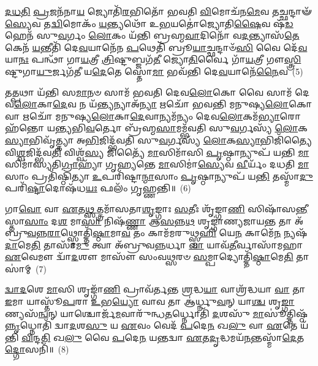 \-\ul{𑌦}\-\-\ul{𑌧}\-\-\ul{𑌤𑌿} \ul{𑌪𑍍𑌰}\-𑌜𑌨᳴𑌨𑌾\-\ul{𑌯} 𑌜𑍍𑌯𑍋𑌤𑌿᳴\-\ul{𑌰}\-𑌭𑌿𑌤𑍋᳴ 𑌭𑌵𑌤𑌿 \ul{𑌵𑌿}\-𑌮𑍋𑌚᳴𑌨\-\ul{𑌮𑍇}\-𑌵 𑌤𑌚𑍍𑌛𑌨𑍍𑌦𑌾𑍟᳴\-\ul{𑌸𑍍𑌯𑍇}\-𑌵 𑌤\-\ul{𑌦𑍍𑌵𑌿}\-𑌮𑍋𑌕𑌂᳴ \ul{𑌯}\-𑌨𑍍𑌤𑍍𑌯𑌥𑍋᳴ 𑌉\-\ul{𑌭}\-𑌯𑌤𑍋॑𑌜𑍍𑌯𑍋𑌤𑌿\-\ul{𑌷𑍈}\-𑌵 𑌷᳴\-\ul{𑌡}\-𑌹𑍇𑌨᳴ 𑌸𑍁\-\ul{𑌵}\-𑌰𑍍𑌗𑌂 \ul{𑌲𑍋}\-𑌕𑌂 𑌯᳴𑌨𑍍𑌤𑌿 𑌬𑍍𑌰𑌹𑍍𑌮\-\ul{𑌵𑌾}\-𑌦𑌿𑌨𑍋᳴ 𑌵\-\ul{𑌦}\-𑌨𑍍𑌤𑍍𑌯𑌾𑌸᳴\-\ul{𑌤𑍇} 𑌕𑍇𑌨᳴ \ul{𑌯}\-𑌨𑍍𑌤𑍀𑌤𑌿᳴ 𑌦𑍇\-\ul{𑌵}\-𑌯𑌾𑌨𑍇᳴𑌨 \ul{𑌪}\-𑌥𑍇𑌤𑌿᳴ 𑌬𑍍𑌰𑍂\-\ul{𑌯𑌾}\-𑌚𑍍𑌛𑌨𑍍𑌦𑌾𑍞᳴\-\ul{𑌸𑌿} 𑌵𑍈 𑌦𑍇᳴\-\ul{𑌵}\-𑌯𑌾\-\ul{𑌨𑌃} 𑌪𑌨𑍍𑌥𑌾᳴ 𑌗𑌾\-\ul{𑌯}\-𑌤𑍍𑌰𑍀 \ul{𑌤𑍍𑌰𑌿}\-𑌷𑍍𑌟𑍁𑌬𑍍𑌜𑌗᳴\-\ul{𑌤𑍀} 𑌜𑍍𑌯𑍋\-\ul{𑌤𑌿}\-𑌰𑍍𑌵𑍈 𑌗𑌾᳴\-\ul{𑌯}\-𑌤𑍍𑌰𑍀 𑌗𑍗\-\ul{𑌸𑍍𑌤𑍍𑌰𑌿}\-𑌷𑍍𑌟𑍁𑌗𑌾\-\ul{𑌯𑍁}\-𑌰𑍍𑌜𑌗᳴𑌤𑍀 𑌯\-\ul{𑌦𑍇}\-𑌤𑍇 𑌸𑍍𑌤𑍋\-\ul{𑌮𑌾} 𑌭𑌵᳴𑌨𑍍𑌤𑌿 𑌦𑍇\-\ul{𑌵}\-𑌯𑌾𑌨𑍇᳴\-\ul{𑌨𑍈}\-𑌵~(5)

𑌤\-\ul{𑌤𑍍𑌪}\-𑌥𑌾 𑌯᳴𑌨𑍍𑌤𑌿 𑌸\-\ul{𑌮𑌾}\-𑌨𑍞 𑌸𑌾𑌮᳴ 𑌭𑌵𑌤𑌿 𑌦𑍇𑌵\-\ul{𑌲𑍋}\-𑌕𑍋 𑌵𑍈 𑌸𑌾𑌮᳴ 𑌦𑍇𑌵\-\ul{𑌲𑍋}\-𑌕𑌾\-\ul{𑌦𑍇}\-𑌵 𑌨 𑌯᳴\-\ul{𑌨𑍍𑌤𑍍𑌯}\-𑌨𑍍𑌯𑌾𑌅᳴\-\ul{𑌨𑍍𑌯𑌾} 𑌋𑌚𑍋᳴ 𑌭𑌵𑌨𑍍𑌤𑌿 𑌮𑌨𑍁𑌷𑍍𑌯\-\ul{𑌲𑍋}\-𑌕𑍋 𑌵𑌾 𑌋𑌚𑍋᳴ 𑌮𑌨𑍁𑌷𑍍𑌯\-\ul{𑌲𑍋}\-𑌕𑌾\-\ul{𑌦𑍇}\-𑌵𑌾𑌨𑍍𑌯𑌮᳴𑌨𑍍𑌯𑌂 𑌦𑍇𑌵\-\ul{𑌲𑍋}\-𑌕𑌮᳴\-\ul{𑌭𑍍𑌯𑌾}\-𑌰𑍋𑌹᳴𑌨𑍍𑌤𑍋 𑌯𑌨𑍍𑌤𑍍𑌯𑌭𑌿\-\ul{𑌵}\-𑌰𑍍𑌤𑍋 𑌬𑍍𑌰᳴𑌹𑍍𑌮\-\ul{𑌸𑌾}\-𑌮𑌮𑍍𑌭᳴𑌵𑌤𑌿 𑌸𑍁\-\ul{𑌵}\-𑌰𑍍𑌗𑌸𑍍𑌯᳴ \ul{𑌲𑍋}\-𑌕\-\ul{𑌸𑍍𑌯𑌾}\-𑌭𑌿𑌵𑍃᳴𑌤𑍍𑌤𑍍𑌯𑌾 𑌅\-\ul{𑌭𑌿}\-𑌜𑌿𑌦𑍍𑌭᳴𑌵𑌤𑌿 𑌸𑍁\-\ul{𑌵}\-𑌰𑍍𑌗𑌸𑍍𑌯᳴ \ul{𑌲𑍋}\-𑌕\-\ul{𑌸𑍍𑌯𑌾}\-𑌭𑌿𑌜𑌿᳴𑌤𑍍𑌯𑍈 𑌵𑌿\-\ul{𑌶𑍍𑌵}\-𑌜𑌿𑌦𑍍𑌭᳴𑌵\-\ul{𑌤𑌿} 𑌵𑌿𑌶𑍍𑌵᳴\-\ul{𑌸𑍍𑌯} 𑌜𑌿𑌤𑍍𑌯𑍈᳴ \ul{𑌮𑌾}\-𑌸𑌿𑌮𑌾᳴𑌸𑌿 \ul{𑌪𑍃}\-𑌷𑍍𑌠𑌾𑌨𑍍𑌯𑍁𑌪᳴ 𑌯𑌨𑍍𑌤𑌿 \ul{𑌮𑌾}\-𑌸𑌿𑌮𑌾॑𑌸𑍍𑌯𑌤𑌿\-\ul{𑌗𑍍𑌰𑌾}\-𑌹𑍍𑌯𑌾᳴ 𑌗𑍃𑌹𑍍𑌯𑌨𑍍𑌤𑍇 \ul{𑌮𑌾}\-𑌸𑌿𑌮𑌾॑\-\ul{𑌸𑍍𑌯𑍇}\-𑌵 \ul{𑌵𑍀}\-𑌰𑍍𑌯𑌂᳴ 𑌦𑌧𑌤𑌿 \ul{𑌮𑌾}\-𑌸𑌾𑌂 𑌪𑍍𑌰𑌤𑌿᳴𑌷𑍍𑌠𑌿𑌤𑍍𑌯𑌾 \ul{𑌉}\-𑌪𑌰𑌿᳴𑌷𑍍𑌟𑌾\-\ul{𑌨𑍍𑌮𑌾}\-𑌸𑌾𑌂 \ul{𑌪𑍃}\-𑌷𑍍𑌠𑌾𑌨𑍍𑌯𑍁𑌪᳴ 𑌯\-\ul{𑌨𑍍𑌤𑌿} 𑌤𑌸𑍍𑌮𑌾᳴\-\ul{𑌦𑍁}\-𑌪𑌰𑌿᳴\-\ul{𑌷𑍍𑌟𑌾}\-𑌦𑍋𑌷᳴𑌧\-\ul{𑌯𑌃} 𑌫𑌲𑌂᳴ 𑌗𑍃𑌹𑍍𑌣𑌨𑍍𑌤𑌿॥~(6)

{\anuvakamend[{\-\ul{𑌗𑍋}\-\-\ul{𑌸}\-𑌤𑍍𑌤𑍍𑌰𑌂 𑌵𑌾 𑌏᳴𑌤𑌿 𑌸𑌂𑌵\-\ul{𑌥𑍍𑌸}\-𑌰𑍋॑\-𑌽𑌰𑍍𑌧\-\ul{𑌮𑌾}\-𑌸𑌾 𑌮𑌿᳴\-\ul{𑌥𑍁}\-𑌨𑌮𑍍𑌮᳴\-\ul{𑌧𑍍𑌯}\-𑌤𑍋 𑌦𑍇᳴\-\ul{𑌵}\-𑌯𑌾𑌨𑍇᳴\-\ul{𑌨𑍈}\-𑌵 \ul{𑌵𑍀}\-𑌰𑍍𑌯᳴𑌨𑍍𑌤𑍍𑌰𑌯𑍋᳴𑌦𑌶 𑌚}]}%

𑌗𑌾\-\ul{𑌵𑍋} 𑌵𑌾 \ul{𑌏}\-𑌤\-\ul{𑌥𑍍𑌸}\-𑌤𑍍𑌤𑍍𑌰𑌮𑌾᳴𑌸𑌤𑌾\-\ul{𑌶𑍃}\-𑌙𑍍𑌗𑌾𑌃 \ul{𑌸}\-𑌤𑍀𑌃 𑌶𑍃᳴𑌙𑍍𑌗𑌾\-\ul{𑌣𑌿} 𑌸𑌿𑌷𑌾᳴𑌸\-\ul{𑌨𑍍𑌤𑍀}\-𑌸𑍍𑌤𑌾\-\ul{𑌸𑌾𑌂} 𑌦\-\ul{𑌶} 𑌮𑌾\-\ul{𑌸𑌾} 𑌨𑌿𑌷᳴\-\ul{𑌣𑍍𑌣𑌾} 𑌆\-\ul{𑌸}\-𑌨𑍍𑌨\-\ul{𑌥} 𑌶𑍃𑌙𑍍𑌗𑌾॑𑌣𑍍𑌯𑌜𑌾𑌯\-\ul{𑌨𑍍𑌤} 𑌤𑌾 𑌅᳴𑌬𑍍𑌰𑍁\-\ul{𑌵}\-𑌨𑍍𑌨\-\ul{𑌰𑌾}\-𑌥𑍍𑌸𑍍𑌮𑍋𑌤𑍍𑌤𑌿᳴\-\ul{𑌷𑍍𑌠𑌾}\-𑌮𑌾\-\ul{𑌵} 𑌤𑌂 𑌕𑌾𑌮᳴𑌮𑌰𑍁𑌥𑍍𑌸𑍍𑌮\-\ul{𑌹𑌿} 𑌯𑍇\-\ul{𑌨} 𑌕𑌾𑌮𑍇᳴\-\ul{𑌨} 𑌨𑍍𑌯𑌷᳴\-\ul{𑌦𑌾}\-𑌮𑍇\-\ul{𑌤𑌿} 𑌤𑌾𑌸𑌾᳴\-\ul{𑌮𑍁} 𑌤𑍍𑌵𑌾 𑌅᳴𑌬𑍍𑌰𑍁𑌵\-\ul{𑌨𑍍𑌨}\-𑌰𑍍𑌧𑌾 \ul{𑌵𑌾} 𑌯𑌾𑌵᳴\-\ul{𑌤𑍀}\-𑌰𑍍𑌵𑌾𑌸𑌾᳴𑌮𑌹𑌾 \ul{𑌏}\-𑌵𑍇𑌮𑍗 𑌦𑍍𑌵𑌾᳴\-\ul{𑌦}\-𑌶𑍗 𑌮𑌾𑌸𑍗᳴ 𑌸𑌂𑌵\-\ul{𑌥𑍍𑌸}\-𑌰𑍞 \ul{𑌸}\-𑌮𑍍𑌪𑌾𑌦𑍍𑌯𑍋𑌤𑍍𑌤𑌿᳴\-\ul{𑌷𑍍𑌠𑌾}\-𑌮𑍇\-\ul{𑌤𑌿} 𑌤𑌾𑌸𑌾॑𑌮𑍍~(7)

\-\ul{𑌦𑍍𑌵𑌾}\-\-\ul{𑌦}\-𑌶𑍇 \ul{𑌮𑌾}\-𑌸𑌿 𑌶𑍃𑌙𑍍𑌗𑌾᳴\-\ul{𑌣𑌿} 𑌪𑍍𑌰𑌾𑌵᳴𑌰𑍍𑌤𑌨𑍍𑌤 \ul{𑌶𑍍𑌰}\-𑌦𑍍𑌧\-\ul{𑌯𑌾} 𑌵𑌾𑌶𑍍𑌰᳴𑌦𑍍𑌧𑌯𑌾 \ul{𑌵𑌾} 𑌤𑌾 \ul{𑌇}\-𑌮𑌾 𑌯𑌾𑌸𑍍𑌤𑍂᳴\-\ul{𑌪}\-𑌰𑌾 \ul{𑌉}\-𑌭\-\ul{𑌯𑍍𑌯𑍋} 𑌵𑌾𑌵 𑌤𑌾 𑌆॑𑌰𑍍𑌧𑍍𑌨𑍁\-\ul{𑌵}\-𑌨𑍍 𑌯𑌾\-\ul{𑌶𑍍𑌚} 𑌶𑍃\-\ul{𑌙𑍍𑌗𑌾}\-𑌣𑍍𑌯𑌸᳴\-\ul{𑌨𑍍𑌵}\-𑌨𑍍 𑌯𑌾𑌶𑍍𑌚𑍋𑌰𑍍𑌜᳴\-\ul{𑌮}\-𑌵𑌾𑌰𑍁᳴𑌨𑍍𑌧\-\ul{𑌤}\-𑌰𑍍𑌧𑍍𑌨𑍋𑌤𑌿᳴ \ul{𑌦}\-𑌶𑌸𑍁᳴ \ul{𑌮𑌾}\-𑌸𑍂॑𑌤𑍍𑌤𑌿𑌷𑍍𑌠᳴\-\ul{𑌨𑍍𑌨𑍃}\-𑌧𑍍𑌨𑍋𑌤𑌿᳴ 𑌦𑍍𑌵𑌾\-\ul{𑌦}\-𑌶\-\ul{𑌸𑍁} 𑌯 \ul{𑌏}\-𑌵𑌂 𑌵𑍇𑌦᳴ \ul{𑌪}\-𑌦𑍇\-\ul{𑌨} 𑌖\-\ul{𑌲𑍁} 𑌵𑌾 \ul{𑌏}\-𑌤𑍇 𑌯᳴𑌨𑍍𑌤𑌿 \ul{𑌵𑌿}\-𑌨𑍍𑌦\-\ul{𑌤𑌿} 𑌖\-\ul{𑌲𑍁} 𑌵𑍈 \ul{𑌪}\-𑌦𑍇\-\ul{𑌨} 𑌯𑌨𑍍𑌤𑌦𑍍𑌵𑌾 \ul{𑌏}\-𑌤\-\ul{𑌦𑍃}\-𑌦𑍍𑌧𑌮𑌯᳴\-\ul{𑌨}\-𑌨𑍍𑌤𑌸𑍍𑌮𑌾᳴\-\ul{𑌦𑍇}\-𑌤\-\ul{𑌦𑍍𑌗𑍋}\-𑌸𑌨𑌿᳴॥~(8)

